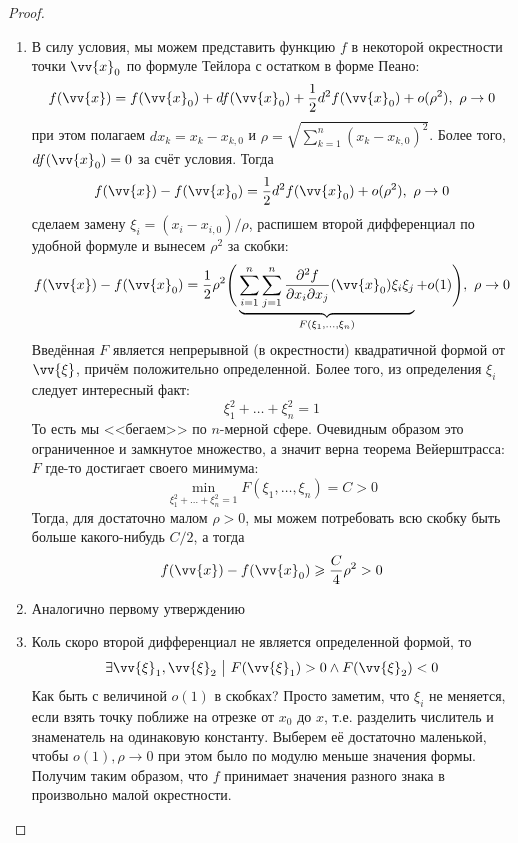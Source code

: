 \begin{proof}~
	\begin{enumerate}
		\item В силу условия, мы можем представить функцию $f$ в некоторой окрестности точки $\vv{x}_0$ по формуле Тейлора с остатком в форме Пеано:
		\[
			f(\vv{x}) = f(\vv{x}_0) + df(\vv{x}_0) + \frac{1}{2}d^2f(\vv{x}_0) + o(\rho^2),\ \rho \to 0
		\]
		при этом полагаем $dx_k = x_k - x_{k, 0}$ и $\rho = \sqrt{\sum_{k = 1}^n (x_k - x_{k, 0})^2}$. Более того, $df(\vv{x}_0) = 0$ за счёт условия. Тогда
		\[
			f(\vv{x}) - f(\vv{x}_0) = \frac{1}{2} d^2f(\vv{x}_0) + o(\rho^2),\ \rho \to 0
		\]
		сделаем замену $\xi_i = (x_i - x_{i, 0}) / \rho$, распишем второй дифференциал по удобной формуле и вынесем $\rho^2$ за скобки:
		\[
			f(\vv{x}) - f(\vv{x}_0) = \frac{1}{2}\rho^2 \Bigg(\underbrace{\sum_{i = 1}^n \sum_{j = 1}^n \pd{^2 f}{x_i \vdelta x_j} (\vv{x}_0) \xi_i \xi_j}_{F(\xi_1, \ldots, \xi_n)} + o(1)\Bigg),\ \rho \to 0
		\]
		Введённая $F$ является непрерывной (в окрестности) квадратичной формой от $\vv{\xi}$, причём положительно определенной. Более того, из определения $\xi_i$ следует интересный факт:
		\[
			\xi_1^2 + \ldots + \xi_n^2 = 1
		\]
		То есть мы <<бегаем>> по $n$-мерной сфере. Очевидным образом это ограниченное и замкнутое множество, а значит верна теорема Вейерштрасса: $F$ где-то достигает своего минимума:
		\[
			\min_{\xi_1^2 + \ldots + \xi_n^2 = 1} F(\xi_1, \ldots, \xi_n) = C > 0
		\]
		Тогда, для достаточно малом $\rho > 0$, мы можем потребовать всю скобку быть больше какого-нибудь $C / 2$, а тогда
		\[
			f(\vv{x}) - f(\vv{x}_0) \ge \frac{C}{4} \rho^2 > 0
		\]
		
		\item Аналогично первому утверждению
		
		\item Коль скоро второй дифференциал не является определенной формой, то
		\[
			\exists \vv{\xi}_1, \vv{\xi}_2 \such F(\vv{\xi}_1) > 0 \wedge F(\vv{\xi}_2) < 0
		\]
		Как быть с величиной $o(1)$ в скобках? Просто заметим, что $\xi_i$ не меняется, если взять точку поближе на отрезке от $x_0$ до $x$, т.е. разделить числитель и знаменатель на одинаковую константу. Выберем её достаточно маленькой, чтобы $o(1), \rho \to 0$ при этом было по модулю меньше значения формы. Получим таким образом, что $f$ принимает значения разного знака в произвольно малой окрестности.
	\end{enumerate}
\end{proof}

